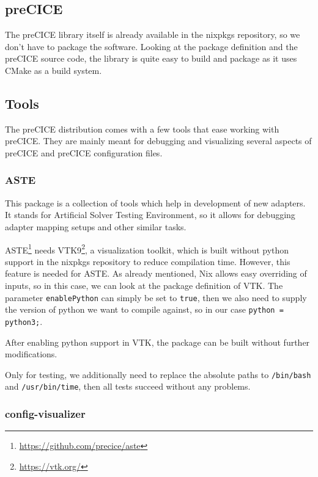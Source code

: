 \documentclass{eceasst}
\begin{document}
\subsection{preCICE}

The preCICE library itself is already available in the nixpkgs repository, so we don't have to package the software.
Looking at the package definition and the preCICE source code, the library is quite easy to build and package as it uses CMake as a build system.

\subsection{Tools}

The preCICE distribution comes with a few tools that ease working with preCICE.
They are mainly meant for debugging and visualizing several aspects of preCICE and preCICE configuration files.

\subsubsection{ASTE}

This package is a collection of tools which help in development of new adapters.
It stands for Artificial Solver Testing Environment, so it allows for debugging adapter mapping setups and other similar tasks.

ASTE\footnote{\url{https://github.com/precice/aste}} needs VTK9\footnote{\url{https://vtk.org/}}, a visualization toolkit, which is built without python support in the nixpkgs repository to reduce compilation time.
However, this feature is needed for ASTE.
As already mentioned, Nix allows easy overriding of inputs, so in this case, we can look at the package definition of VTK.
The parameter \texttt{enablePython} can simply be set to \texttt{true}, then we also need to supply the version of python we want to compile against, so in our case \texttt{python = python3;}.

After enabling python support in VTK, the package can be built without further modifications.

Only for testing, we additionally need to replace the absolute paths to \texttt{/bin/bash} and \texttt{/usr/bin/time}, then all tests succeed without any problems.

\subsubsection{config-visualizer}
\end{document}
